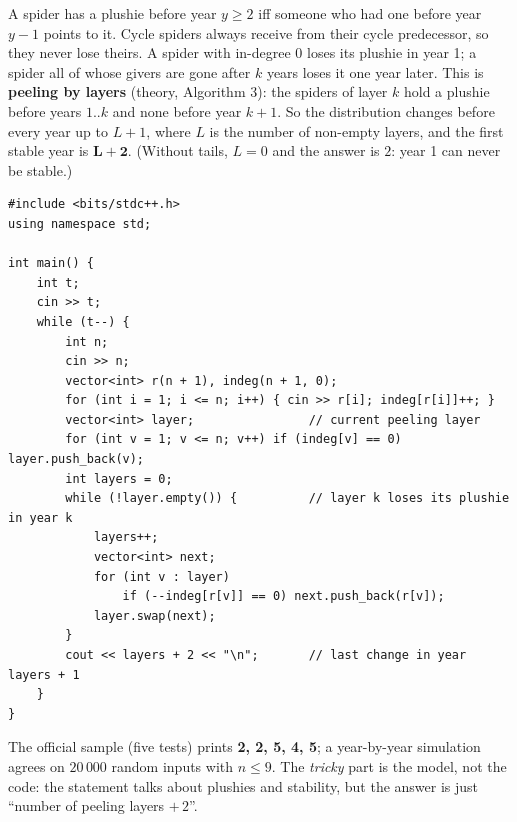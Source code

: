 \begin{solutionbox}
A spider has a plushie before year $y \ge 2$ iff someone who had one before year $y-1$ points to it. Cycle spiders always receive from their cycle predecessor, so they never lose theirs. A spider with in-degree 0 loses its plushie in year 1; a spider all of whose givers are gone after $k$ years loses it one year later. This is \textbf{peeling by layers} (theory, Algorithm 3): the spiders of layer $k$ hold a plushie before years $1..k$ and none before year $k+1$. So the distribution changes before every year up to $L+1$, where $L$ is the number of non-empty layers, and the first stable year is $\mathbf{L + 2}$. (Without tails, $L = 0$ and the answer is $2$: year 1 can never be stable.)
\begin{center}
\end{center}
\begin{lstlisting}[style=cpp]
#include <bits/stdc++.h>
using namespace std;

int main() {
    int t;
    cin >> t;
    while (t--) {
        int n;
        cin >> n;
        vector<int> r(n + 1), indeg(n + 1, 0);
        for (int i = 1; i <= n; i++) { cin >> r[i]; indeg[r[i]]++; }
        vector<int> layer;                // current peeling layer
        for (int v = 1; v <= n; v++) if (indeg[v] == 0) layer.push_back(v);
        int layers = 0;
        while (!layer.empty()) {          // layer k loses its plushie in year k
            layers++;
            vector<int> next;
            for (int v : layer)
                if (--indeg[r[v]] == 0) next.push_back(r[v]);
            layer.swap(next);
        }
        cout << layers + 2 << "\n";       // last change in year layers + 1
    }
}
\end{lstlisting}
The official sample (five tests) prints \textbf{2, 2, 5, 4, 5}; a year-by-year simulation agrees on $20\,000$ random inputs with $n \le 9$. The \emph{tricky} part is the model, not the code: the statement talks about plushies and stability, but the answer is just ``number of peeling layers $+\,2$''.
\end{solutionbox}
